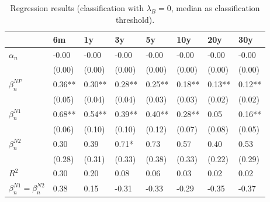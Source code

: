\documentclass[11pt,a4paper,english,oneside]{book}
\numberwithin{equation}{chapter}
\begin{document}
\begin{table}[h] %
	\centering %
	\begin{tabular}{ p{2cm}  p{1cm} p{1cm} p{1cm} p{1cm} p{1cm} p{1cm} p{1cm} } %
		\toprule %
		& 6m 		& 1y 		& 3y 		& 5y 		& 10y 		& 20y 		& 30y \\
		\midrule %
		$\alpha_n$ & -0.00 & -0.00 & -0.00 & -0.00 & -0.00 & -0.00 & -0.00\\
		& (0.00) & (0.00) & (0.00) & (0.00) & (0.00) & (0.00) & (0.00)\\
		$\beta_n^{NP}$ & 0.36** & 0.30** & 0.28** & 0.25** & 0.18** & 0.13** & 0.12**\\
		& (0.05) & (0.04) & (0.04) & (0.03) & (0.03) & (0.02) & (0.02)\\
		$\beta_n^{N1}$ & 0.68** & 0.54** & 0.39** & 0.40** & 0.28** & 0.05 & 0.16**\\
		& (0.06) & (0.10) & (0.10) & (0.12) & (0.07) & (0.08) & (0.05)\\
		$\beta_n^{N2}$ & 0.30 & 0.39 & 0.71* & 0.73 & 0.57 & 0.40 & 0.53\\
		& (0.28) & (0.31) & (0.33) & (0.38) & (0.33) & (0.22) & (0.29)\\
		$R^2$ & 0.30 & 0.20 & 0.08 & 0.06 & 0.03 & 0.02 & 0.02\\
		$\beta_n^{N1} = \beta_n^{N2}$ & 0.38 & 0.15 & -0.31 & -0.33 & -0.29 & -0.35 & -0.37\\
		\bottomrule %
	\end{tabular}
	\caption{Regression results (classification with $\lambda_B=0$, median as classification threshold).} %
	\label{tab:reg1Mod} %
\end{table}
\end{document}
